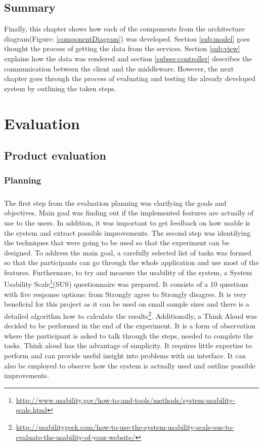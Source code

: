 \documentclass{l4proj}
\begin{document}
\section{Summary}
Finally, this chapter shows how each of the components from the architecture diagram(Figure: \ref{componentDiagram}) was developed. Section \ref{sub:model} goes thought the process of getting the data from the services. Section \ref{sub:view} explains how the data was rendered and section \ref{subsec:controller} describes the communication between the client and the middleware. However, the next chapter goes through the process of evaluating and testing the already developed system by outlining the taken steps.  

\chapter{Evaluation}

\section{Product evaluation}

\subsection{Planning}
\paragraph{}
The first step from the evaluation planning was clarifying the goals and objectives. Main goal was finding out if the implemented features are actually of use to the users. In addition, it was important to get feedback on how usable is the system and extract possible improvements. The second step was identifying the techniques that were going to be used so that the experiment can be designed. To address the main goal,  a carefully selected list of tasks was formed so that the participants can go through the whole application and use most of the features. Furthermore, to try and measure the usability of the system, a System Usability Scale\footnote{\url{http://www.usability.gov/how-to-and-tools/methods/system-usability-scale.html}}(SUS) questionnaire was prepared. It consists of a 10 questions with five response options: from Strongly agree to Strongly disagree. It is very beneficial for this project as it can be used on small sample sizes and there is a detailed algorithm how to calculate the results\footnote{\url{http://usabilitygeek.com/how-to-use-the-system-usability-scale-sus-to-evaluate-the-usability-of-your-website/}}. Additionally, a Think Aloud was decided to be performed in the end of the experiment. It is a form of observation where the participant is asked to talk through the steps, needed to complete the tasks\cite{hci}. Think aloud has the advantage of simplicity. It requires little expertise to perform and can provide useful insight into problems with an interface. It can also be employed to observe how the system is actually used and outline possible improvements.
\end{document}
